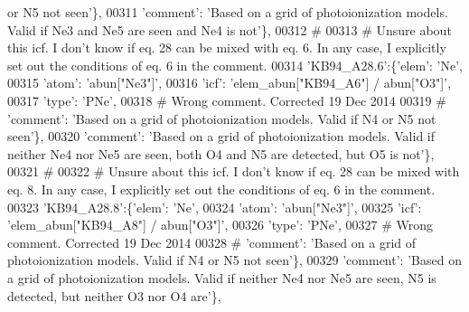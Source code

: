 \begin{DoxyCode}
{       or N5 not seen'\},}
00311                                       \textcolor{stringliteral}{'comment'}: \textcolor{stringliteral}{'Based on a grid of photoionization models. Valid if Ne3
       and Ne5 are seen and Ne4 is not'}\},
00312 \textcolor{comment}{#}
00313 \textcolor{comment}{# Unsure about this icf. I don't know if eq. 28 can be mixed with eq. 6. In any case, I explicitly set out
       the conditions of eq. 6 in the comment.}
00314                          \textcolor{stringliteral}{'KB94\_A28.6'}:\{\textcolor{stringliteral}{'elem'}: \textcolor{stringliteral}{'Ne'},
00315                                        \textcolor{stringliteral}{'atom'}: \textcolor{stringliteral}{'abun["Ne3"]'},
00316                                        \textcolor{stringliteral}{'icf'}: \textcolor{stringliteral}{'elem\_abun["KB94\_A6"]  / abun["O3"]'},
00317                                       \textcolor{stringliteral}{'type'}: \textcolor{stringliteral}{'PNe'},
00318 \textcolor{comment}{# Wrong comment. Corrected 19 Dec 2014}
00319 \textcolor{comment}{#                                      'comment': 'Based on a grid of photoionization models. Valid if N4
       or N5 not seen'\},}
00320                                       \textcolor{stringliteral}{'comment'}: \textcolor{stringliteral}{'Based on a grid of photoionization models. Valid if
       neither Ne4 nor Ne5 are seen, both O4 and N5 are detected, but O5 is not'}\},
00321 \textcolor{comment}{#}
00322 \textcolor{comment}{# Unsure about this icf. I don't know if eq. 28 can be mixed with eq. 8. In any case, I explicitly set out
       the conditions of eq. 6 in the comment.}
00323                          \textcolor{stringliteral}{'KB94\_A28.8'}:\{\textcolor{stringliteral}{'elem'}: \textcolor{stringliteral}{'Ne'},
00324                                      \textcolor{stringliteral}{'atom'}: \textcolor{stringliteral}{'abun["Ne3"]'},
00325                                      \textcolor{stringliteral}{'icf'}: \textcolor{stringliteral}{'elem\_abun["KB94\_A8"]  / abun["O3"]'},
00326                                       \textcolor{stringliteral}{'type'}: \textcolor{stringliteral}{'PNe'},
00327 \textcolor{comment}{# Wrong comment. Corrected 19 Dec 2014}
00328 \textcolor{comment}{#                                      'comment': 'Based on a grid of photoionization models. Valid if N4
       or N5 not seen'\},}
00329                                       \textcolor{stringliteral}{'comment'}: \textcolor{stringliteral}{'Based on a grid of photoionization models. Valid if
       neither Ne4 nor Ne5 are seen, N5 is detected, but neither O3 nor O4 are'}\},

\end{DoxyCode}
